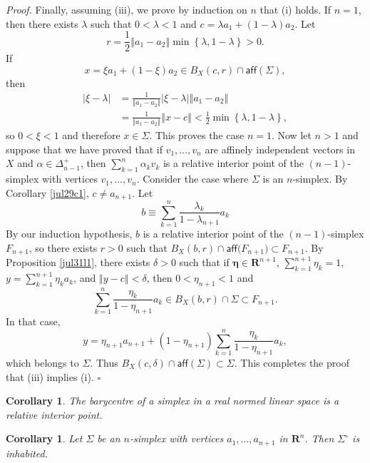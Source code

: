 \documentclass[11pt]{article}%
\newtheorem{corollary}[theorem]{Corollary}
\newenvironment{proof}[1][Proof]{\noindent\textit{#1.} }{}
\begin{document}
\begin{proof}
Finally, assuming (iii), we prove by induction on $n$ that (i) holds. If $n=1
$, then there exists $\lambda$ such that $0<\lambda<1$ and $c=\lambda
a_{1}+(1-\lambda)a_{2}$. Let%
\[
r=\frac{1}{2}\left\Vert a_{1}-a_{2}\right\Vert \min\left\{  \lambda
,1-\lambda\right\}  >0.
\]
If%
\[
x=\xi a_{1}+\left(  1-\xi\right)  a_{2}\in B_{X}(c,r)\cap\mathsf{aff}%
(\Sigma),
\]
then%
\begin{align*}
\left\vert \xi-\lambda\right\vert  &  =\frac{1}{\left\Vert a_{1}%
-a_{2}\right\Vert }\left\vert \xi-\lambda\right\vert \left\Vert a_{1}%
-a_{2}\right\Vert \\
&  =\frac{1}{\left\Vert a_{1}-a_{2}\right\Vert }\left\Vert x-c\right\Vert
<\frac{1}{2}\min\left\{  \lambda,1-\lambda\right\}  ,
\end{align*}
so $0<\xi<1$ and therefore $x\in\Sigma$. This proves the case $n=1$. Now let
$n>1$ and suppose that we have proved that if $v_{1},\ldots,v_{n}$ are
affinely independent vectors in $X$ and $\mathsf{\alpha}\in\Delta_{n-1}^{+}$,
then $\sum_{k=1}^{n}\alpha_{k}v_{k}$ is a relative interior point of the
$(n-1)$-simplex with vertices $v_{1},\ldots,v_{n}$. Consider the case where
$\Sigma$ is an $n$-simplex. By Corollary \ref{jul29c1}, $c\neq a_{n+1}$. Let
\[
b\equiv\sum_{k=1}^{n}\frac{\lambda_{k}}{1-\lambda_{n+1}}a_{k}%
\]
By our induction hypothesis, $b$ is a relative interior point of the
$(n-1)$-simplex $F_{n+1}$, so there exists $r>0$ such that $B_{X}%
(b,r)\cap\mathsf{aff(}F_{n+1})\subset F_{n+1}$. By Proposition \ref{jul31l1},
there exists $\delta>0$ such that if $\mathbf{\eta\in R}^{n+1}$, $\sum
_{k=1}^{n+1}\eta_{k}=1$, $y=\sum_{k=1}^{n+1}\eta_{k}a_{k}$, and $\left\Vert
y-c\right\Vert <\delta$, then $0<\eta_{n+1}<1$ and%
\[
\sum_{k=1}^{n}\frac{\eta_{k}}{1-\eta_{n+1}}a_{k}\in B_{X}(b,r)\cap
\Sigma\subset F_{n+1}.
\]
In that case,%
\[
y=\eta_{n+1}a_{n+1}+\left(  1-\eta_{n+1}\right)  \sum_{k=1}^{n}\frac{\eta_{k}%
}{1-\eta_{n+1}}a_{k},
\]
which belongs to $\Sigma$. Thus $B_{X}(c,\delta)\cap\mathsf{aff}%
(\Sigma)\subset\Sigma$. This completes the proof that (iii) implies (i).%
\hfill
$\square$
\end{proof}

\begin{corollary}
\label{jul24c1}The barycentre of a simplex in a real normed linear space is a
relative interior point.
\end{corollary}

\begin{corollary}
\label{sept09c1}Let $\Sigma$ be an $n$-simplex with vertices $a_{1}%
,\ldots,a_{n+1}$ in $\mathbf{R}^{n}$. Then $\Sigma^{\circ}$ is inhabited.
\end{corollary}
\end{document}
